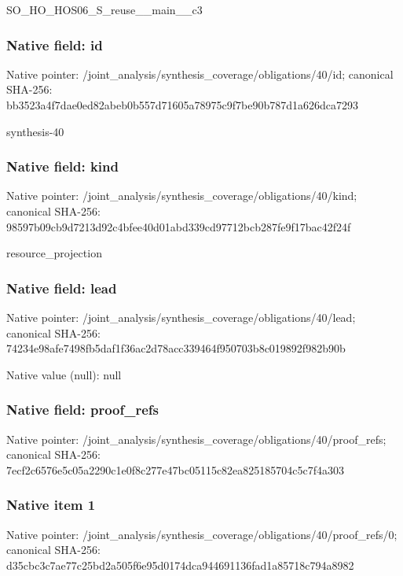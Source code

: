\documentclass[10pt,a4paper]{article}
\begin{document}
\begingroup\raggedright\sloppy SO\_\allowbreak{}HO\_\allowbreak{}HOS06\_\allowbreak{}S\_\allowbreak{}reuse\_\allowbreak{}\_\allowbreak{}main\_\allowbreak{}\_\allowbreak{}c3\par\endgroup

\subsubsection{Native field: id}
Native pointer: /joint\_\allowbreak{}analysis/synthesis\_\allowbreak{}coverage/obligations/40/id; canonical SHA-256: bb3523a4f7dae0ed82abeb0b557d71605a78975c9f7be90b787d1a626dca7293

\begingroup\raggedright\sloppy synthesis-40\par\endgroup

\subsubsection{Native field: kind}
Native pointer: /joint\_\allowbreak{}analysis/synthesis\_\allowbreak{}coverage/obligations/40/kind; canonical SHA-256: 98597b09cb9d7213d92c4bfee40d01abd339cd97712bcb287fe9f17bac42f24f

\begingroup\raggedright\sloppy resource\_\allowbreak{}projection\par\endgroup

\subsubsection{Native field: lead}
Native pointer: /joint\_\allowbreak{}analysis/synthesis\_\allowbreak{}coverage/obligations/40/lead; canonical SHA-256: 74234e98afe7498fb5daf1f36ac2d78acc339464f950703b8c019892f982b90b

Native value (null): null

\subsubsection{Native field: proof\_\allowbreak{}refs}
Native pointer: /joint\_\allowbreak{}analysis/synthesis\_\allowbreak{}coverage/obligations/40/proof\_\allowbreak{}refs; canonical SHA-256: 7ecf2c6576e5c05a2290c1e0f8c277e47bc05115c82ea825185704c5c7f4a303

\subsubsection{Native item 1}
Native pointer: /joint\_\allowbreak{}analysis/synthesis\_\allowbreak{}coverage/obligations/40/proof\_\allowbreak{}refs/0; canonical SHA-256: d35cbc3c7ae77c25bd2a505f6e95d0174dca944691136fad1a85718c794a8982
\end{document}
